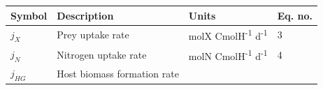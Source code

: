 \documentclass[]{elsarticle} %
\begin{document}
\begin{longtable}[c]{@{}llll@{}}
\toprule
\begin{minipage}[b]{0.12\columnwidth}\raggedright\strut
Symbol
\strut\end{minipage} &
\begin{minipage}[b]{0.48\columnwidth}\raggedright\strut
Description
\strut\end{minipage} &
\begin{minipage}[b]{0.26\columnwidth}\raggedright\strut
Units
\strut\end{minipage} &
\begin{minipage}[b]{0.10\columnwidth}\raggedright\strut
Eq. no.
\strut\end{minipage}\tabularnewline
\midrule
\endhead
\begin{minipage}[t]{0.12\columnwidth}\raggedright\strut
\(j_X\)
\strut\end{minipage} &
\begin{minipage}[t]{0.48\columnwidth}\raggedright\strut
Prey uptake rate
\strut\end{minipage} &
\begin{minipage}[t]{0.26\columnwidth}\raggedright\strut
molX CmolH\textsuperscript{-1} d\textsuperscript{-1}
\strut\end{minipage} &
\begin{minipage}[t]{0.10\columnwidth}\raggedright\strut
3
\strut\end{minipage}\tabularnewline
\begin{minipage}[t]{0.12\columnwidth}\raggedright\strut
\(j_N\)
\strut\end{minipage} &
\begin{minipage}[t]{0.48\columnwidth}\raggedright\strut
Nitrogen uptake rate
\strut\end{minipage} &
\begin{minipage}[t]{0.26\columnwidth}\raggedright\strut
molN CmolH\textsuperscript{-1} d\textsuperscript{-1}
\strut\end{minipage} &
\begin{minipage}[t]{0.10\columnwidth}\raggedright\strut
4
\strut\end{minipage}\tabularnewline
\begin{minipage}[t]{0.12\columnwidth}\raggedright\strut
\(j_{HG}\)
\strut\end{minipage} &
\begin{minipage}[t]{0.48\columnwidth}\raggedright\strut
Host biomass formation rate
\strut\end{minipage} &

\end{longtable}
\end{document}
